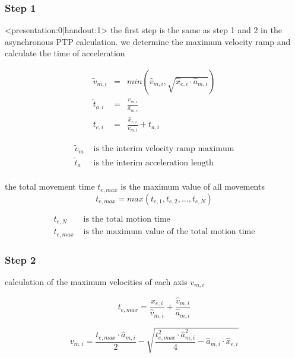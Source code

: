 \documentclass[professionalfonts, 
               xcolor={ usenames, %
                        dvipsnames,%
                        svgnames,%
                        table,%
                        hyperref%
                      }
              ]{beamer}
\begin{document}
\subsubsection{Step 1}
\begin{frame}<presentation:0|handout:1>
the first step is the same as step 1 and 2 in the asynchronous PTP calculation. we determine the maximum velocity ramp and  calculate the time of acceleration
\end{frame}

\begin{frame}
\begin{eqnarray*}
\tilde{v}_{m,i} & = & min(\hat{v}_{m,i},\sqrt{\hat{x}_{e,i} \cdot \hat{a}_{m,i}}) \\
\tilde{t}_{a,i} & = & \frac{v_{m,i}}{\hat{a}_{m,i}}\\
t_{e,i} & = & \frac{\hat{x}_{e,i}}{v_{m,i}} + t_{a,i}
\end{eqnarray*}

\begin{align*}
\tilde{v}_{m} & \text{ is the interim velocity ramp maximum}\\
\tilde{t}_{a} & \text{ is the interim acceleration length}\\
\end{align*}                 
\end{frame}

\begin{frame}
the total movement time $t_{e,max}$ is the maximum value of all movements
\begin{equation}
t_{e,max} = max(t_{e,1},t_{e,2},...,t_{e,N})
\end{equation}

\begin{align*}
t_{e,N} & \text{ is the total motion time } \\
t_{e,max} & \text{ is the maximum value of the total motion time}      
\end{align*}
\end{frame}
  
\subsubsection{Step 2}
\begin{frame}
calculation of the maximum velocities of each axis $v_{m,i}$

\begin{equation*}
t_{e,max} = \frac{\hat{x}_{e,i}}{\hat{v}_{m,i}}+\frac{\hat{v}_{m,i}}{\hat{a}_{m,i}}
\end{equation*}


\begin{equation}
v_{m,i} = \frac{t_{e,max} \cdot \hat{a}_{m,i}}{2}-\sqrt{\frac{t_{e,max}^2 \cdot \hat{a}_{m,i}^2}{4}-\hat{a}_{m,i}\cdot \hat{x}_{e,i}}
\end{equation}
\end{frame}
  
\end{document}
